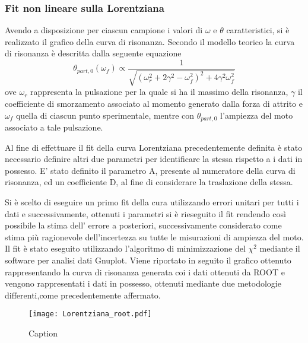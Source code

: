 \documentclass[a4paper,11pt,oneside]{article}
\begin{document}
\subsubsection{Fit non lineare sulla Lorentziana}
Avendo a disposizione per ciascun campione i valori di $\omega$ e $\theta$ caratteristici, si è realizzato il grafico della curva di risonanza. Secondo il modello teorico la curva di risonanza è descritta dalla seguente equazione
\begin{equation*}
    \theta_{part, 0}(\omega_{f}) \propto \frac{1}{\sqrt{(\omega_{r}^2+ 2\gamma^2-\omega_{f}^2)^2+4\gamma^2\omega_{f}^2}}
\end{equation*}
ove $\omega_{r}$ rappresenta la pulsazione per la quale si ha il massimo della risonanza, $\gamma$ il coefficiente di smorzamento associato al momento generato dalla forza di attrito e $\omega_{f}$ quella di ciascun punto sperimentale, mentre con $\theta_{part,0}$ l'ampiezza del moto associato a tale pulsazione.

Al fine di effettuare il fit della curva Lorentziana precedentemente definita è stato necessario definire altri due parametri per identificare la stessa rispetto a i dati in possesso. E' stato definito il parametro A, presente al numeratore della curva di risonanza, ed un coefficiente D, al fine di considerare la traslazione della stessa.

Si è scelto di eseguire un primo fit della cura utilizzando errori unitari per tutti i dati e successivamente, ottenuti i parametri si è rieseguito il fit rendendo così possibile la stima dell' errore a posteriori, successivamente considerato come stima più ragionevole dell'incertezza su tutte le misurazioni di ampiezza del moto.
Il fit è stato eseguito utilizzando l'algoritmo di minimizzazione del $\chi^2$ mediante il software per analisi dati Gnuplot.
Viene riportato in seguito il grafico ottenuto  rappresentando la curva di risonanza generata coi i dati ottenuti da ROOT e vengono rappresentati i dati in possesso, ottenuti mediante due metodologie differenti,come precedentemente affermato.






\begin{figure}[h!]
    \centering
    \texttt{[image: Lorentziana\_root.pdf]}
    \caption{Caption}
    \label{fig:lorentziana_root}
\end{figure}
\end{document}
